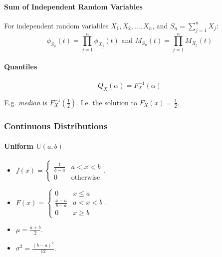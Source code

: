 \documentclass[twocolumn,english]{article}
\begin{document}
\paragraph{Sum of Independent Random Variables}

For independent random variables $X_{1},X_{2},\dots,X_{n}$, and $S_{n}=\sum_{j=1}^{n}X_{j}$:
\[
\phi_{S_{n}}\left(t\right)=\prod_{j=1}^{n}\phi_{X_{j}}\left(t\right)\text{ and }M_{S_{n}}\left(t\right)=\prod_{j=1}^{n}M_{X_{j}}\left(t\right)
\]

\paragraph{Quantiles}

\[
Q_{X}\left(\alpha\right)=F_{X}^{-1}\left(\alpha\right)
\]

E.g. \emph{median} is $F_{X}^{-1}\left(\frac{1}{2}\right)$. I.e.
the solution to $F_{X}\left(x\right)=\frac{1}{2}$.

\subsubsection{Continuous Distributions}

\paragraph{Uniform $\text{U}\left(a,b\right)$}
\begin{itemize}
\item $f\left(x\right)=\begin{cases}
\frac{1}{b-a} & a<x<b\\
0 & \text{otherwise}
\end{cases}$.
\item $F\left(x\right)=\begin{cases}
0 & x\leq a\\
\frac{x-a}{b-a} & a<x<b\\
0 & x\geq b
\end{cases}$.
\item $\mu=\frac{a+b}{2}$.
\item $\sigma^{2}=\frac{\left(b-a\right)^{2}}{12}$.
\end{itemize}
\end{document}
